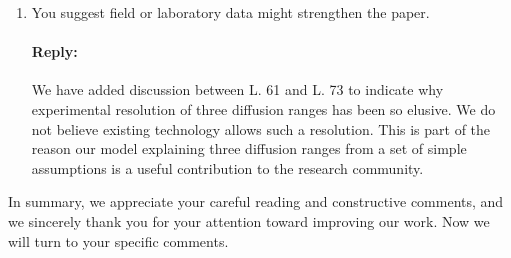 \documentclass[11pt]{article}
\begin{document}
\begin{enumerate}
\item You suggest field or laboratory data might strengthen the paper.
\paragraph{Reply:}
We have added discussion between L. 61 and L. 73 to indicate why experimental resolution of three diffusion ranges has been so elusive. We do not believe existing technology allows such a resolution. This is part of the reason our model explaining three diffusion ranges from a set of simple assumptions is a useful contribution to the research community.

\end{enumerate}
In summary, we appreciate your careful reading and constructive comments, and we sincerely thank you for your attention toward improving our work. Now we will turn to your specific comments.
\end{document}
